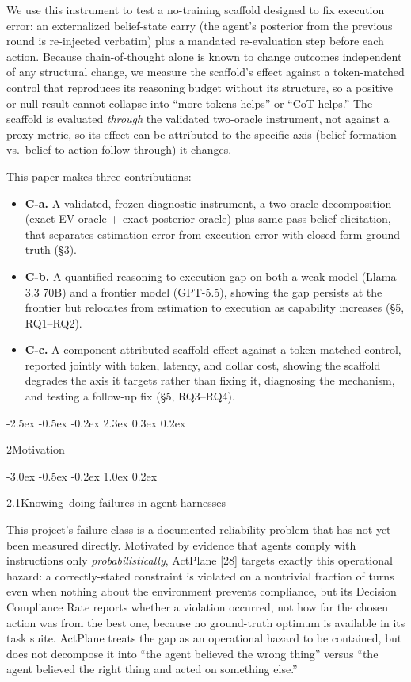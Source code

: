 \documentclass[
  11pt,
]{article}
\makeatletter
\providecommand{\tightlist}{%
  \setlength{\itemsep}{0pt}\setlength{\parskip}{0pt}}
\renewcommand{\section}{%
  \@startsection{section}{1}{\z@}%
                {-2.5ex \@plus -0.5ex \@minus -0.2ex}%
                { 2.3ex \@plus  0.3ex \@minus  0.2ex}%
                {\large\bf\raggedright}%
}
\renewcommand{\subsection}{%
  \@startsection{subsection}{2}{\z@}%
                {-3.0ex \@plus -0.5ex \@minus -0.2ex}%
                { 1.0ex \@plus  0.2ex}%
                {\normalsize\bf\raggedright}%
}
\makeatother
\begin{document}
We use this instrument to test a no-training scaffold designed to fix execution error: an externalized belief-state carry (the agent's posterior from the previous round is re-injected verbatim) plus a mandated re-evaluation step before each action. Because chain-of-thought alone is known to change outcomes independent of any structural change, we measure the scaffold's effect against a token-matched control that reproduces its reasoning budget without its structure, so a positive or null result cannot collapse into ``more tokens helps'' or ``CoT helps.'' The scaffold is evaluated \emph{through} the validated two-oracle instrument, not against a proxy metric, so its effect can be attributed to the specific axis (belief formation vs.~belief-to-action follow-through) it changes.

This paper makes three contributions:

\begin{itemize}
\tightlist
\item
  \textbf{C-a.} A validated, frozen diagnostic instrument, a two-oracle decomposition (exact EV oracle + exact posterior oracle) plus same-pass belief elicitation, that separates estimation error from execution error with closed-form ground truth (§3).
\item
  \textbf{C-b.} A quantified reasoning-to-execution gap on both a weak model (Llama 3.3 70B) and a frontier model (GPT-5.5), showing the gap persists at the frontier but relocates from estimation to execution as capability increases (§5, RQ1--RQ2).
\item
  \textbf{C-c.} A component-attributed scaffold effect against a token-matched control, reported jointly with token, latency, and dollar cost, showing the scaffold degrades the axis it targets rather than fixing it, diagnosing the mechanism, and testing a follow-up fix (§5, RQ3--RQ4).
\end{itemize}

\section{2\quad Motivation}\label{motivation}

\subsection{2.1\quad Knowing--doing failures in agent harnesses}\label{knowingdoing-failures-in-agent-harnesses}

This project's failure class is a documented reliability problem that has not yet been measured directly. Motivated by evidence that agents comply with instructions only \emph{probabilistically}, ActPlane {[}28{]} targets exactly this operational hazard: a correctly-stated constraint is violated on a nontrivial fraction of turns even when nothing about the environment prevents compliance, but its Decision Compliance Rate reports whether a violation occurred, not how far the chosen action was from the best one, because no ground-truth optimum is available in its task suite. ActPlane treats the gap as an operational hazard to be contained, but does not decompose it into ``the agent believed the wrong thing'' versus ``the agent believed the right thing and acted on something else.''
\end{document}

